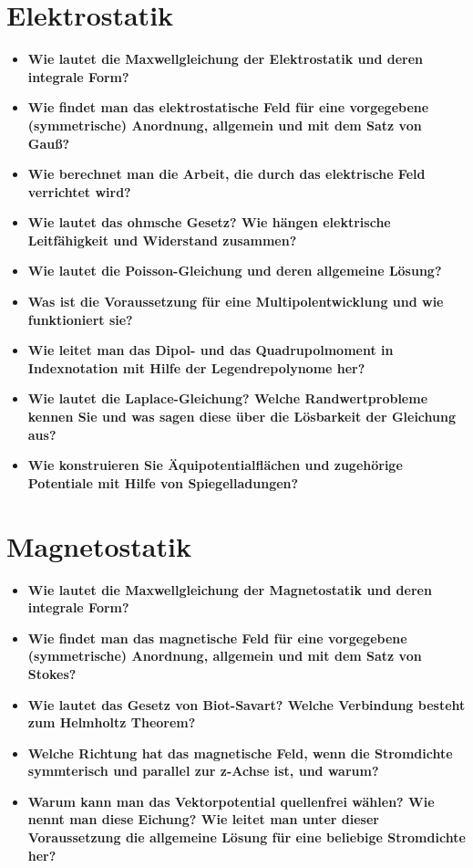 \documentclass[german]{latex4ei/latex4ei_sheet}
\begin{document}
\section{Elektrostatik}
\begin{itemize}
	\item \textbf{Wie lautet die Maxwellgleichung der Elektrostatik und deren integrale Form?}
	\item \textbf{Wie findet man das elektrostatische Feld für eine vorgegebene (symmetrische) Anordnung, allgemein und mit dem Satz von Gauß?}
	\item \textbf{Wie berechnet man die Arbeit, die durch das elektrische Feld verrichtet wird?}
	\item \textbf{Wie lautet das ohmsche Gesetz? Wie hängen elektrische Leitfähigkeit und Widerstand zusammen?}
	\item \textbf{Wie lautet die Poisson-Gleichung und deren allgemeine Lösung?}
	\item \textbf{Was ist die Voraussetzung für eine Multipolentwicklung und wie funktioniert sie?}
	\item \textbf{Wie leitet man das Dipol- und das Quadrupolmoment in Indexnotation mit Hilfe der Legendrepolynome her?}
	\item \textbf{Wie lautet die Laplace-Gleichung? Welche Randwertprobleme kennen Sie und was sagen diese über die Lösbarkeit der Gleichung aus?}
	\item \textbf{Wie konstruieren Sie Äquipotentialflächen und zugehörige Potentiale mit Hilfe von Spiegelladungen?}
\end{itemize}
\section{Magnetostatik}
\begin{itemize}
	\item \textbf{Wie lautet die Maxwellgleichung der Magnetostatik und deren integrale Form?}
	\item \textbf{Wie findet man das magnetische Feld für eine vorgegebene (symmetrische) Anordnung, allgemein und mit dem Satz von Stokes?}
	\item \textbf{Wie lautet das Gesetz von Biot-Savart? Welche Verbindung besteht zum Helmholtz Theorem?}
	\item \textbf{Welche Richtung hat das magnetische Feld, wenn die Stromdichte symmterisch und parallel zur z-Achse ist, und warum?}
	\item \textbf{Warum kann man das Vektorpotential quellenfrei wählen? Wie nennt man diese Eichung? Wie leitet man unter dieser Voraussetzung die allgemeine Lösung für eine beliebige Stromdichte her?}
\end{itemize}
\end{document}
